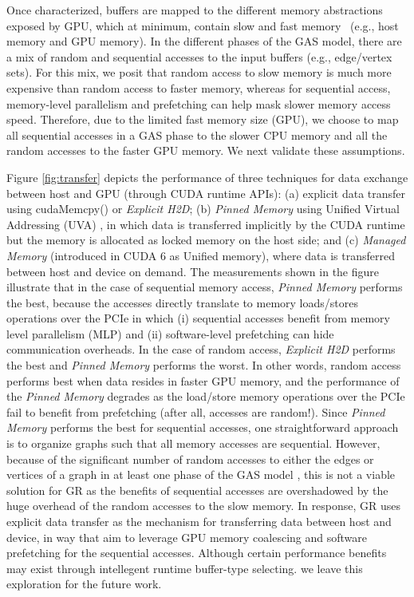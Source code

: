 Once characterized, buffers are mapped to the different memory abstractions exposed by GPU, which at minimum, contain slow and fast memory~\cite{nemu} 
(e.g., host memory and GPU memory). In the different phases of the GAS model, there are a mix of random and sequential accesses to the input 
buffers (e.g., edge/vertex sets). For this mix, we posit that random access to slow memory is much more expensive than random access 
to faster memory, whereas for sequential access, memory-level parallelism and prefetching can help mask slower memory access speed. Therefore, due to the limited fast memory size (GPU), we choose to map all sequential accesses in a GAS phase to the slower CPU memory and all the random accesses to the faster GPU memory. 
We next validate these assumptions.

Figure \ref{fig:transfer} depicts the performance of three techniques for data exchange between host and GPU (through CUDA runtime APIs): 
(a) explicit data transfer using cudaMemcpy() or \textit{Explicit H2D}; (b) \textit {Pinned Memory} using Unified Virtual Addressing (UVA) \cite{UVA}, 
in which data is transferred implicitly by the CUDA runtime but the memory is allocated as locked memory on the host side; and 
(c) \textit {Managed Memory} (introduced in CUDA 6 \cite{UVA} as Unified memory), where data is transferred between host and device on demand. 
The measurements shown in the figure illustrate that in the case of sequential memory access, \textit{Pinned Memory} performs the best, 
because the accesses directly translate to memory loads/stores operations over the PCIe in which (i) sequential accesses benefit from 
memory level parallelism (MLP) and (ii) software-level prefetching can hide communication overheads. In the case of random access, 
\textit{Explicit H2D} performs the best and \textit{Pinned Memory} performs the worst. In other words, random access performs 
best when data resides in faster GPU memory, and the performance of the \textit{Pinned Memory} degrades as the load/store memory operations 
over the PCIe fail to benefit from prefetching (after all, accesses are random!). Since \textit{Pinned Memory} performs the best 
for sequential accesses, one straightforward approach is to organize graphs such that all memory accesses are sequential. 
However, because of the significant number of random accesses to either the edges or vertices of a graph in at least one phase of the 
GAS model \cite{chi,xstream}, this is not a viable solution for GR as the benefits of sequential accesses  are overshadowed by the huge overhead of the random accesses to the slow memory. In response, GR uses explicit data transfer as the mechanism for transferring 
data between host and device, in way that aim to leverage GPU memory coalescing and software prefetching for the sequential accesses. Although certain performance benefits may exist through intellegent runtime buffer-type selecting. we leave this exploration for the future work. 

